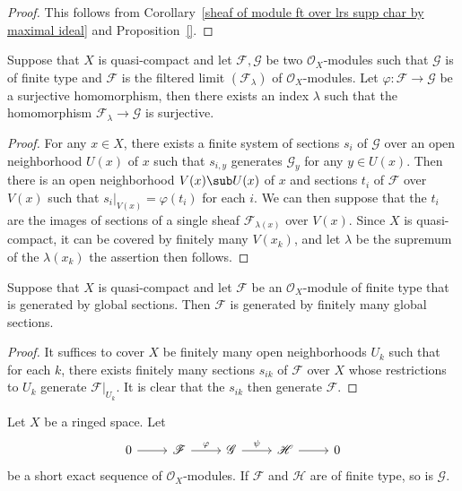 \begin{proof}
This follows from Corollary~\ref{sheaf of module ft over lrs supp char by maximal ideal} and Proposition~\ref{}.
\end{proof}
\begin{proposition}\label{sheaf of module ft over qc surjective homomorphism prop}
Suppose that $X$ is quasi-compact and let $\mathscr{F},\mathscr{G}$ be two $\mathscr{O}_X$-modules such that $\mathscr{G}$ is of finite type and $\mathscr{F}$ is the filtered limit $(\mathscr{F}_\lambda)$ of $\mathscr{O}_X$-modules. Let $\varphi:\mathscr{F}\to\mathscr{G}$ be a surjective homomorphism, then there exists an index $\lambda$ such that the homomorphism $\mathscr{F}_\lambda\to\mathscr{G}$ is surjective.
\end{proposition}
\begin{proof}
For any $x\in X$, there exists a finite system of sections $s_i$ of $\mathscr{G}$ over an open neighborhood $U(x)$ of $x$ such that $s_{i,y}$ generates $\mathscr{G}_y$ for any $y\in U(x)$. Then there is an open neighborhood $V(x)\sub U(x)$ of $x$ and sections $t_i$ of $\mathscr{F}$ over $V(x)$ such that $s_i|_{V(x)}=\varphi(t_i)$ for each $i$. We can then suppose that the $t_i$ are the images of sections of a single sheaf $\mathscr{F}_{\lambda(x)}$ over $V(x)$. Since $X$ is quasi-compact, it can be covered by finitely many $V(x_k)$, and let $\lambda$ be the supremum of the $\lambda(x_k)$ the assertion then follows.
\end{proof}
\begin{corollary}\label{sheaf of module ft over qc global generated then finite}
Suppose that $X$ is quasi-compact and let $\mathscr{F}$ be an $\mathscr{O}_X$-module of finite type that is generated by global sections. Then $\mathscr{F}$ is generated by finitely many global sections.
\end{corollary}
\begin{proof}
It suffices to cover $X$ be finitely many open neighborhoods $U_k$ such that for each $k$, there exists finitely many sections $s_{ik}$ of $\mathscr{F}$ over $X$ whose restrictions to $U_k$ generate $\mathscr{F}|_{U_k}$. It is clear that the $s_{ik}$ then generate $\mathscr{F}$.
\end{proof}
\begin{proposition}\label{sheaf of module ft exact sequence}
Let $X$ be a ringed space. Let 
\[\begin{tikzcd}
0\ar[r]&\mathscr{F}\ar[r,"\varphi"]&\mathscr{G}\ar[r,"\psi"]&\mathscr{H}\ar[r]&0
\end{tikzcd}\] 
be a short exact sequence of $\mathscr{O}_X$-modules. If $\mathscr{F}$ and $\mathscr{H}$ are of finite type, so is $\mathscr{G}$.
\end{proposition}
